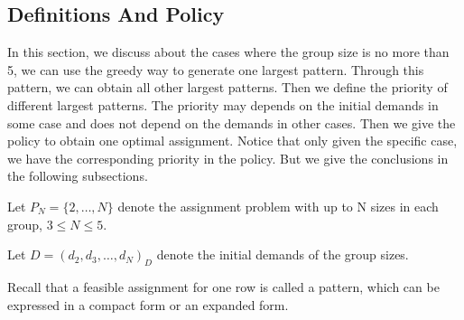 %



%
%


\newpage

\subsection{Definitions And Policy}

In this section, we discuss about the cases where the group size is no more than 5, we can use the greedy way to generate one largest pattern. Through this pattern, we can obtain all other largest patterns. Then we define the priority of different largest patterns. The priority may depends on the initial demands in some case and does not depend on the demands in other cases. Then we give the policy to obtain one optimal assignment. Notice that only given the specific case, we have the corresponding priority in the policy. But we give the conclusions in the following subsections.

\begin{definition}
Let $P_N = \{2,\ldots,N\}$ denote the assignment problem with up to N sizes in each group, $3 \leq N \leq 5$.

Let $D = (d_{2},d_{3}, \ldots, d_{N})_D$ denote the initial demands of the group sizes.
\end{definition}

Recall that a feasible assignment for one row is called a pattern, which can be expressed in a compact form or an expanded form.

